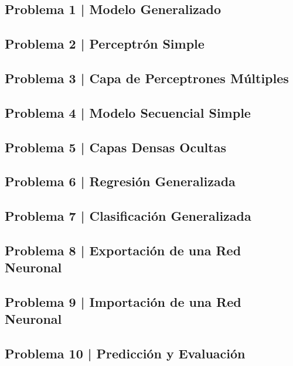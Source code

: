 \documentclass{article}
\begin{document}
\subsection*{Problema 1 | Modelo Generalizado}

\subsection*{Problema 2 | Perceptrón Simple}

\subsection*{Problema 3 | Capa de Perceptrones Múltiples}

\subsection*{Problema 4 | Modelo Secuencial Simple}

\subsection*{Problema 5 | Capas Densas Ocultas}

\subsection*{Problema 6 | Regresión Generalizada}

\subsection*{Problema 7 | Clasificación Generalizada}

\subsection*{Problema 8 | Exportación de una Red Neuronal}

\subsection*{Problema 9 | Importación de una Red Neuronal}

\subsection*{Problema 10 | Predicción y Evaluación}
\end{document}
